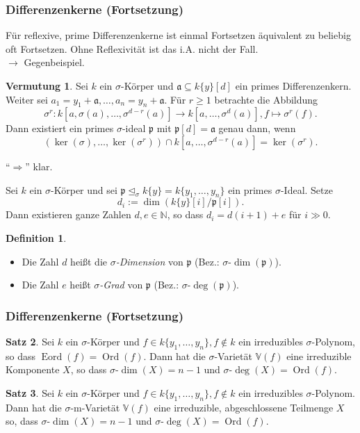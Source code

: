 \documentclass{beamer}
\def\N{\mathbb{N}}
\def\N{\mathbb{N}}
\def\VV{\mathbb{V}}
\def\a{\mathfrak{a}}
\def\p{\mathfrak{p}}
\def\s{\sigma}
\def\si{\unlhd_{\sigma}}
\theoremstyle{definition}
\newtheorem{satz}{Satz}[section]
\newtheorem{conj}{Vermutung}[section]
\newtheorem{defn}[satz]{Definition}
\begin{document}
\begin{frame}\frametitle{Differenzenkerne (Fortsetzung)}
Für reflexive, prime Differenzenkerne ist einmal Fortsetzen äquivalent zu beliebig oft Fortsetzen. Ohne Reflexivität ist das i.A. nicht der Fall. \\
$\rightarrow$ Gegenbeispiel. 
\begin{conj}
Sei $k$ ein $\s$-Körper und $\a \subseteq k\{y\}[d]$ ein primes Differenzenkern.
Weiter sei $a_1 = y_1 + \a ,\ldots,a_n = y_n + \a$.
Für $r \geq 1$ betrachte die Abbildung 
\[ \s^r : k[a,\s(a),\ldots,\s^{d-r}(a)] \rightarrow k[a,\ldots,\s^{d}(a)], f \mapsto \s^r(f). \]
Dann existiert ein primes $\s$-ideal $\p$ mit $\p[d] = \a$ genau dann, wenn
\begin{equation*} (\operatorname{ker}(\s),\ldots,\operatorname{ker}(\s^r)) \cap k[a,\ldots,\s^{d-r}(a)] = \operatorname{ker}(\s^r). \end{equation*}
\end{conj}
``$\Rightarrow$'' klar.
\end{frame}

\begin{frame}
\begin{theorem}\label{di=d(i+1)+e}
Sei $k$ ein $\s$-Körper und sei $\p \si k\{y\} = k\{y_1,\ldots,y_n\}$ ein primes $\s$-Ideal. Setze $$d_i := \dim(k\{y\}[i]/\p[i]).$$
Dann existieren ganze Zahlen $d, e \in \N$, so dass $d_i = d(i+1) + e$ für $i \gg 0$. %
\end{theorem}

\begin{defn}
\begin{itemize}
\item Die Zahl $d$ heißt die \emph{$\s$-Dimension} von $\p$ (Bez.: $\s$-$\dim(\p)$). 
\item Die Zahl $e$ heißt \emph{$\s$-Grad} von $\p$ (Bez.: $\s$-$\operatorname{deg}(\p)$).
\end{itemize}
\end{defn}

\end{frame}

\begin{frame}\frametitle{Differenzenkerne (Fortsetzung)}

\begin{satz}\label{irredcomp}
Sei $k$ ein $\s$-Körper und $f \in k\{y_1,\ldots,y_n\}, f \notin k$ ein irreduzibles $\s$-Polynom, so dass $\operatorname{Eord}(f) = \operatorname{Ord}(f)$. Dann hat die $\s$-Varietät $\VV(f)$ eine irreduzible Komponente $X$, so dass $\s$-$\dim(X) = n-1$ und $\s$-$\operatorname{deg}(X) = \operatorname{Ord}(f)$.
\end{satz}


\begin{satz}\label{corfinal}
Sei $k$ ein $\s$-Körper und $f \in k\{y_1,\ldots,y_n\}, f \notin k$ ein irreduzibles $\s$-Polynom.
Dann hat die $\s$-m-Varietät $\VV(f)$ eine irreduzible, abgeschlossene Teilmenge $X$ so, dass $\s$-$\dim(X) = n-1$ und $\s$-$\operatorname{deg}(X) = \operatorname{Ord}(f)$.
\end{satz}
\end{frame}
\end{document}
